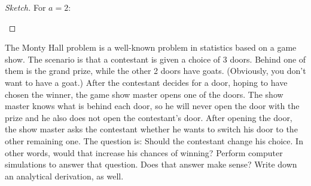 \documentclass[10pt, physics, diagram]{homework}
\begin{document}
	\begin{proof}[Sketch]
		For $a = 2$:
		\begin{center}
		\end{center}
	\end{proof}

	\begin{problem}[12pts]
		The Monty Hall problem is a well-known problem in statistics based on a game show. The scenario is that a contestant is given a choice of 3 doors. Behind one of them is the grand prize, while the other 2 doors have goats. (Obviously, you don’t want to have a goat.) After the contestant decides for a door, hoping to have chosen the winner, the game show master opens one of the doors. The show master knows what is behind each door, so he will never open the door with the prize and he also does not open the contestant’s door. After opening the door, the show master asks the contestant whether he wants to switch his door to the other remaining one. The question is: Should the contestant change his choice. In other words, would that increase his chances of winning? Perform computer simulations to answer that question. Does that answer make sense? Write down an analytical derivation, as well.
	\end{problem}
\end{document}
